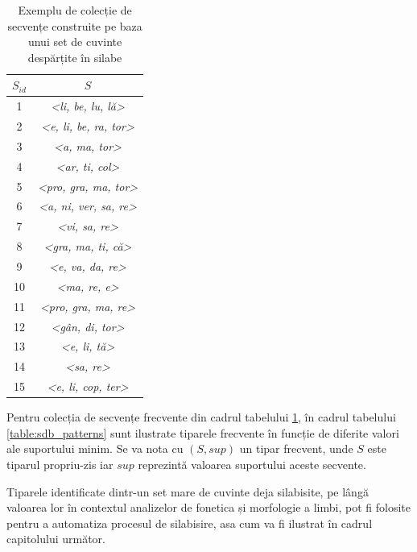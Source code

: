 \begin{table}[h]
\centering    
\begin{tabular}{|c|c|}    
\hline      
$S_{id}$ & $S$ \\
\hline
1 & \textit{<li, be, lu, lă>} \\
2 & \textit{<e, li, be, ra, tor>} \\
3 & \textit{<a, ma, tor>}\\
4 & \textit{<ar, ti, col>} \\
5 & \textit{<pro, gra, ma, tor>} \\
6 & \textit{<a, ni, ver, sa, re>} \\
7 & \textit{<vi, sa, re>} \\
8 & \textit{<gra, ma, ti, că>} \\
9 & \textit{<e, va, da, re>} \\
10 & \textit{<ma, re, e>} \\
11 & \textit{<pro, gra, ma, re>} \\
12 & \textit{<gân, di, tor>} \\
13 & \textit{<e, li, tă>} \\
14 & \textit{<sa, re>} \\
15 & \textit{<e, li, cop, ter>} \\
\hline                              
\end{tabular}
\caption{Exemplu de colecție de secvențe construite pe baza unui set de cuvinte despărțite în silabe}
\label{table:sdb_words}               
\end{table}

Pentru colecția de secvențe frecvente din cadrul tabelului \ref{table:sdb_words}, în cadrul tabelului \ref{table:sdb_patterns} sunt ilustrate tiparele frecvente în funcție de diferite valori ale suportului minim. Se va nota cu $(S,sup)$ un tipar frecvent, unde $S$ este tiparul propriu-zis iar $sup$ reprezintă valoarea suportului aceste secvente.

Tiparele identificate dintr-un set mare de cuvinte deja silabisite, pe lângă valoarea lor în contextul analizelor de fonetica și morfologie a limbi, pot fi folosite pentru a automatiza procesul de silabisire, asa cum va fi ilustrat în cadrul capitolului următor.

